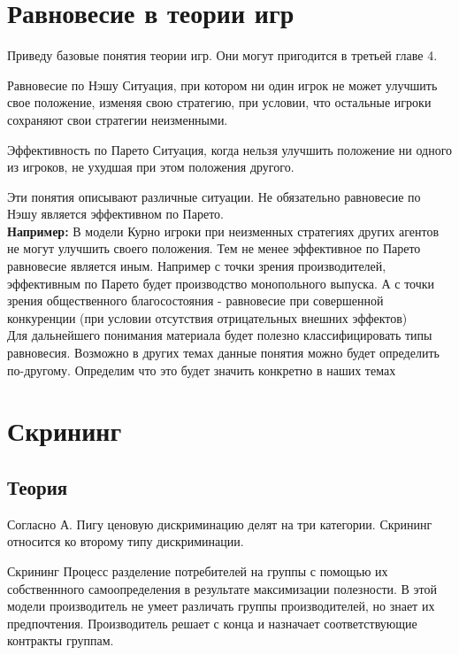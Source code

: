 \section{Равновесие в теории игр}
\indent\setlength{\parindent}{1em}Приведу базовые понятия теории игр. Они могут пригодится в третьей главе 4.
\begin{mybox}{Равновесие по Нэшу}
Ситуация, при котором ни один игрок не может улучшить свое положение, изменяя свою стратегию, при условии, что
остальные игроки сохраняют свои стратегии неизменными.
\end{mybox}
\begin{mybox}{Эффективность по Парето}
Ситуация, когда нельзя улучшить положение ни одного из игроков, не ухудшая при этом положения другого.
\end{mybox}
Эти понятия описывают различные ситуации. Не обязательно равновесие по Нэшу является эффективном по Парето. \smallskip\\ \indent\setlength{\parindent}{1em} \textbf{Например:} В модели Курно игроки при неизменных стратегиях других агентов не могут улучшить своего положения. Тем не менее эффективное по Парето равновесие является иным. Например с точки зрения производителей, эффективным по Парето будет производство монопольного выпуска. А с точки зрения общественного благосостояния - равновесие при совершенной конкуренции (при условии отсутствия отрицательных внешних эффектов)\smallskip\\\indent\setlength{\parindent}{1em} Для дальнейшего понимания материала будет полезно классифицировать типы равновесия. Возможно в других темах данные понятия можно будет определить по-другому. Определим что это будет значить конкретно в наших темах
\newpage
\section{Скрининг}
\subsection{Теория}
\indent\setlength{\parindent}{1em} Согласно А. Пигу ценовую дискриминацию делят на три категории. Скрининг относится
ко второму типу дискриминации.
\begin{mybox}{Скрининг}
Процесс разделение потребителей на группы с помощью их собственнного самоопределения в результате максимизации
полезности. В этой модели производитель не умеет различать группы производителей, но знает их предпочтения.
Производитель решает с конца и назначает соответствующие контракты группам.
\end{mybox}
